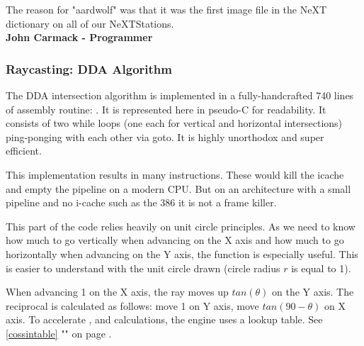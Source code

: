  \begin{fancyquotes}
The reason for "aardwolf" was that it was the first image file in the NeXT dictionary on all of our NeXTStations.
\bigskip \\
\textbf{John Carmack - Programmer}
 \end{fancyquotes}













 
 
 
 
 
 
 
 
\subsubsection{Raycasting: DDA Algorithm}
The DDA intersection algorithm is implemented in a fully-handcrafted 740 lines of assembly routine: . It is represented here in pseudo-C for readability. It consists of two while loops (one each for vertical and horizontal intersections) ping-ponging with each other via goto. It is highly unorthodox and super efficient.\\
\par



\begin{minipage}{\textwidth}

\end{minipage}
This implementation results in many  instructions. These would kill the icache and empty the pipeline on a modern CPU. But on an architecture with a small pipeline and no i-cache such as the 386 it is not a frame killer.\\
\par
This part of the code relies heavily on unit circle principles. As we need to know how much to go vertically when advancing on the X axis and how much to go horizontally when advancing on the Y axis, the  function is especially useful. This is easier to understand with the unit circle drawn (circle radius $r$ is equal to 1).

 \label{unit_circle_label}
\par
When advancing 1 on the X axis, the ray moves up $tan(\theta)$ on the Y axis. The reciprocal is calculated as follows: move 1 on Y axis, move $tan(90-\theta)$ on X axis. To accelerate ,  and  calculations, the engine uses a lookup table. See \ref{cossintable} "" on page \pageref{cossintable}.




















